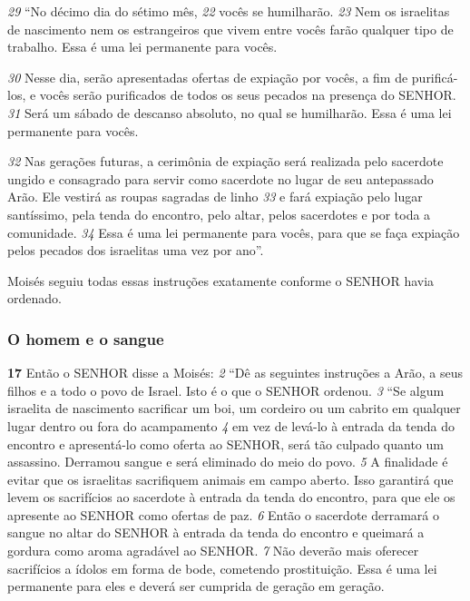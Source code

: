 \smallskip   
\textit{\tiny 29}
“No décimo dia do sétimo mês,
\textit{\tiny 22}
 vocês se humilharão.
\textit{\tiny 23}
 Nem os israelitas de
nascimento nem os estrangeiros que vivem entre vocês farão qualquer tipo de
trabalho. Essa é uma lei permanente para vocês. 

\smallskip   
\textit{\tiny 30}
Nesse dia, serão apresentadas
ofertas de expiação por vocês, a fim de purificá-los, e vocês serão purificados de
todos os seus pecados na presença do SENHOR. 
\textit{\tiny 31}
Será um sábado de descanso
absoluto, no qual se humilharão. Essa é uma lei permanente para vocês. 

\smallskip   
\textit{\tiny 32}
Nas
gerações futuras, a cerimônia de expiação será realizada pelo sacerdote ungido e
consagrado para servir como sacerdote no lugar de seu antepassado Arão. Ele
vestirá as roupas sagradas de linho 
\textit{\tiny 33}
e fará expiação pelo lugar santíssimo, pela
tenda do encontro, pelo altar, pelos sacerdotes e por toda a comunidade. 
\textit{\tiny 34}
Essa é
uma lei permanente para vocês, para que se faça expiação pelos pecados dos
israelitas uma vez por ano”.

\smallskip   
   Moisés seguiu todas essas instruções exatamente conforme o SENHOR havia
ordenado.

\bigskip   
\subsubsection*{O homem e o sangue}
\textbf{\large 17}
 Então o SENHOR disse a Moisés: 
\textit{\tiny 2} 
“Dê as seguintes instruções a Arão, a seus
filhos e a todo o povo de Israel. Isto é o que o SENHOR ordenou. 
\textit{\tiny 3} 
“Se algum israelita de nascimento sacrificar um boi,
 um cordeiro ou um
cabrito em qualquer lugar dentro ou fora do acampamento 
\textit{\tiny 4} 
em vez de levá-lo à
entrada da tenda do encontro e apresentá-lo como oferta ao SENHOR, será tão
culpado quanto um assassino.
 Derramou sangue e será eliminado do meio do
povo. 
\textit{\tiny 5} 
A finalidade é evitar que os israelitas sacrifiquem animais em campo
aberto. Isso garantirá que levem os sacrifícios ao sacerdote à entrada da tenda do
encontro, para que ele os apresente ao SENHOR como ofertas de paz. 
\textit{\tiny 6} 
Então o
sacerdote derramará o sangue no altar do SENHOR à entrada da tenda do encontro
e queimará a gordura como aroma agradável ao SENHOR. 
\textit{\tiny 7} 
Não deverão mais
oferecer sacrifícios a ídolos em forma de bode,
 cometendo prostituição. Essa é
uma lei permanente para eles e deverá ser cumprida de geração em geração. 

